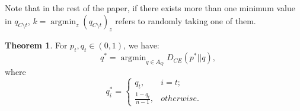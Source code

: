 \documentclass{article}
\theoremstyle{definition}
\newtheorem{theorem}{Theorem}
\begin{document}
Note that in the rest of the paper, if there exists more than one minimum value in $q_{C\setminus t}$, $k =  \mathop{\arg\min}_z (q_{C\setminus t})_z$ refers to randomly taking one of them.

\begin{theorem} \label{model}
For $p_t, q_t \in (0, 1)$, we have:
\begin{equation}\nonumber
    \quad q^* = \mathop{\arg\min}_{q \in A_Q}D_{CE}(p^*|| q),
\end{equation}
where
\begin{equation}\nonumber
  q_i^* =
    \left\{\begin{matrix}
    q_t, & i = t; \\ 
    \frac{1-q_t}{n-1}, & otherwise.
    \end{matrix}\right.
\end{equation}
\end{theorem}
\end{document}
